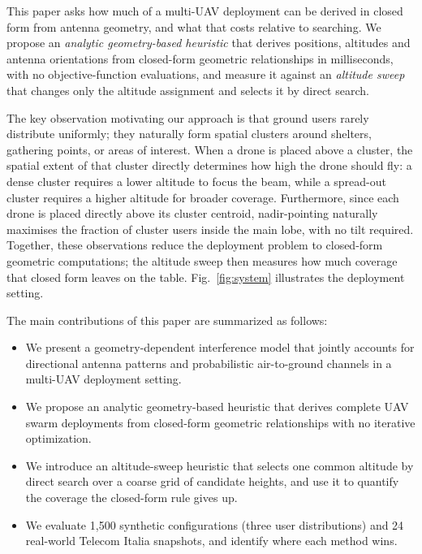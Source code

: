 \documentclass[conference]{IEEEtran}
\begin{document}
This paper asks how much of a multi-UAV deployment can be derived in closed form from antenna geometry, and what that costs relative to searching. We propose an \emph{analytic geometry-based heuristic} that derives positions, altitudes and antenna orientations from closed-form geometric relationships in milliseconds, with no objective-function evaluations, and measure it against an \emph{altitude sweep} that changes only the altitude assignment and selects it by direct search.

The key observation motivating our approach is that ground users rarely distribute uniformly; they naturally form spatial clusters around shelters, gathering points, or areas of interest. When a drone is placed above a cluster, the spatial extent of that cluster directly determines how high the drone should fly: a dense cluster requires a lower altitude to focus the beam, while a spread-out cluster requires a higher altitude for broader coverage. Furthermore, since each drone is placed directly above its cluster centroid, nadir-pointing naturally maximises the fraction of cluster users inside the main lobe, with no tilt required. Together, these observations reduce the deployment problem to closed-form geometric computations; the altitude sweep then measures how much coverage that closed form leaves on the table. Fig.~\ref{fig:system} illustrates the deployment setting.

The main contributions of this paper are summarized as follows:
\begin{itemize}
    \item We present a geometry-dependent interference model that jointly accounts for directional antenna patterns and probabilistic air-to-ground channels in a multi-UAV deployment setting.
    \item We propose an analytic geometry-based heuristic that derives complete UAV swarm deployments from closed-form geometric relationships with no iterative optimization.
    \item We introduce an altitude-sweep heuristic that selects one common altitude by direct search over a coarse grid of candidate heights, and use it to quantify the coverage the closed-form rule gives up.
    \item We evaluate 1{,}500 synthetic configurations (three user distributions) and 24 real-world Telecom Italia snapshots, and identify where each method wins.
\end{itemize}
\end{document}
